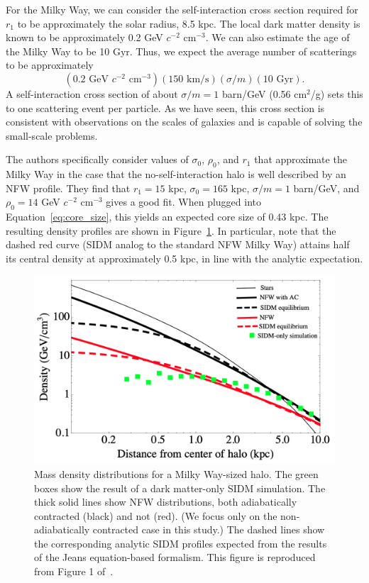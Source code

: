 For the Milky Way, we can consider the self-interaction cross section required
for $r_1$ to be approximately the solar radius, 8.5 kpc. The local dark matter
density is known to be approximately 0.2 GeV $c^{-2}$ cm$^{-3}$. We can also
estimate the age of the Milky Way to be 10 Gyr. Thus, we expect the average
number of scatterings to be approximately
\begin{equation}
    \left( 0.2 \text{ GeV $c^{-2}$ cm$^{-3}$} \right)
    \left( 150 \text{ km/s} \right)
    \left( \sigma/m \right)
    \left( 10 \text{ Gyr} \right).
\end{equation}
A self-interaction cross section of about $\sigma/m = 1$ barn/GeV (0.56
cm$^2$/g) sets this to one scattering event per particle. As we have seen, this
cross section is consistent with observations on the scales of galaxies and is
capable of solving the small-scale problems.

The authors specifically consider values of $\sigma_0$, $\rho_0$, and $r_1$
that approximate the Milky Way in the case that the no-self-interaction halo is
well described by an NFW profile. They find that $r_1 = 15$ kpc, $\sigma_0 =
165$ kpc, $\sigma / m = 1$ barn/GeV, and $\rho_0 = 14$ GeV $c^{-2}$ cm$^{-3}$
gives a good fit. When plugged into Equation~\ref{eq:core_size}, this yields an
expected core size of 0.43 kpc. The resulting density profiles are shown in
Figure~\ref{fig:sidm_expected_density}. In particular, note that the dashed red
curve (SIDM analog to the standard NFW Milky Way) attains half its central
density at approximately 0.5 kpc, in line with the analytic expectation.

\begin{figure}
    \centering
    \includegraphics[width=0.65\linewidth]{figs/kaplinghat_sidm_density.png}
    \caption{%
        Mass density distributions for a Milky Way-sized halo. The green boxes
        show the result of a dark matter-only SIDM simulation. The thick solid
        lines show NFW distributions, both adiabatically contracted (black)
        and not (red). (We focus only on the non-adiabatically contracted case
        in this study.) The dashed lines show the corresponding analytic SIDM
        profiles expected from the results of the Jeans equation-based
        formalism. This figure is reproduced from Figure 1
        of~\cite{kaplinghat_tying_2014}.
    }
    \label{fig:sidm_expected_density}
\end{figure}

